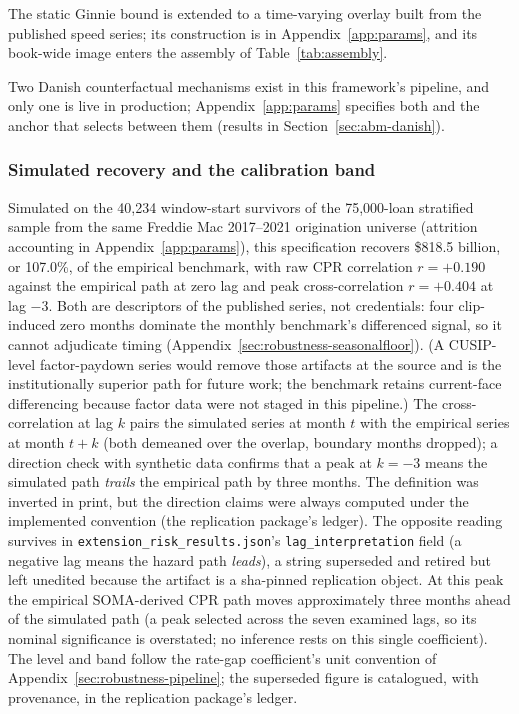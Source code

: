 \documentclass[12pt]{article}
\begin{document}
The static Ginnie bound is extended to a time-varying overlay built from the published speed series; its construction is in Appendix~\ref{app:params}, and its book-wide image enters the assembly of Table~\ref{tab:assembly}.

Two Danish counterfactual mechanisms exist in this framework's pipeline, and only one is live in production; Appendix~\ref{app:params} specifies both and the anchor that selects between them (results in Section~\ref{sec:abm-danish}).

\subsubsection{Simulated recovery and the calibration band}

Simulated on the 40,234 window-start survivors of the 75,000-loan stratified sample from the same Freddie Mac 2017--2021 origination universe (attrition accounting in Appendix~\ref{app:params}), this specification recovers \$818.5 billion, or 107.0\%, of the empirical benchmark, with raw CPR correlation $r = +0.190$ against the empirical path at zero lag and peak cross-correlation $r = +0.404$ at lag $-3$. Both are descriptors of the published series, not credentials: four clip-induced zero months dominate the monthly benchmark's differenced signal, so it cannot adjudicate timing (Appendix~\ref{sec:robustness-seasonalfloor}). (A CUSIP-level factor-paydown series would remove those artifacts at the source and is the institutionally superior path for future work; the benchmark retains current-face differencing because factor data were not staged in this pipeline.) The cross-correlation at lag $k$ pairs the simulated series at month $t$ with the empirical series at month $t+k$ (both demeaned over the overlap, boundary months dropped); a direction check with synthetic data confirms that a peak at $k=-3$ means the simulated path \emph{trails} the empirical path by three months. The definition was inverted in print, but the direction claims were always computed under the implemented convention (the replication package's ledger). The opposite reading survives in \texttt{extension\_risk\_results.json}'s \texttt{lag\_interpretation} field (a negative lag means the hazard path \emph{leads}), a string superseded and retired but left unedited because the artifact is a sha-pinned replication object. At this peak the empirical SOMA-derived CPR path moves approximately three months ahead of the simulated path (a peak selected across the seven examined lags, so its nominal significance is overstated; no inference rests on this single coefficient). The level and band follow the rate-gap coefficient's unit convention of Appendix~\ref{sec:robustness-pipeline}; the superseded figure is catalogued, with provenance, in the replication package's ledger.
\end{document}
